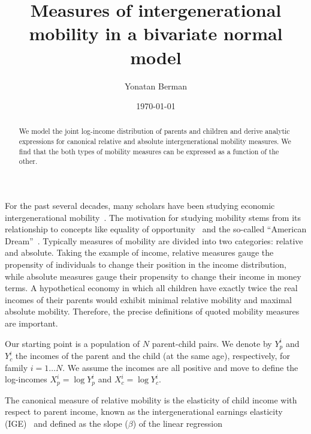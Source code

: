 \documentclass[prl,amsmath,twocolumn,nofootinbib]{revtex4}
\numberwithin{equation}{section}
\begin{document}
\title{Measures of intergenerational mobility in a bivariate normal model}
% 
\author{Yonatan Berman}

\date{\today}

\begin{abstract} 
We model the joint log-income distribution of parents and children and derive analytic expressions for canonical relative and absolute intergenerational mobility measures. We find that the both types of mobility measures can be expressed as a function of the other.
\end{abstract}

\maketitle

For the past several decades, many scholars have been studying economic intergenerational mobility~\cite{mazumder2005fortunate,aaronson2008intergenerational,lee2009trends,hauser2010intergenerational,corak2013income,chetty2014united}. The motivation for studying mobility stems from its relationship to concepts like equality of opportunity~\cite{roemer2000opportunity,chetty2014land} and the so-called ``American Dream''~\cite{corak2009chasing,chetty2017fading}. Typically measures of mobility are divided into two categories: relative and absolute. Taking the example of income, relative measures gauge the propensity of individuals to change their position in the income distribution, while absolute measures gauge their propensity to change their income in money terms. A hypothetical economy in which all children have exactly twice the real incomes of their parents would exhibit minimal relative mobility and maximal absolute mobility. Therefore, the precise definitions of quoted mobility measures are important.

Our starting point is a population of $N$ parent-child pairs. We denote by $Y_p^i$ and $Y_c^i$ the incomes of the parent and the child (at the same age), respectively, for family $i=1\dots N$. We assume the incomes are all positive and move to define the log-incomes $X_p^i=\log Y_p^i$ and $X_c^i=\log Y_c^i$.

The canonical measure of relative mobility is the elasticity of child income with respect to parent income, known as the intergenerational earnings elasticity (IGE)~\cite{mulligan1997parental,lee2009trends,chetty2014land} and defined as the slope ($\beta$) of the linear regression
\end{document}
